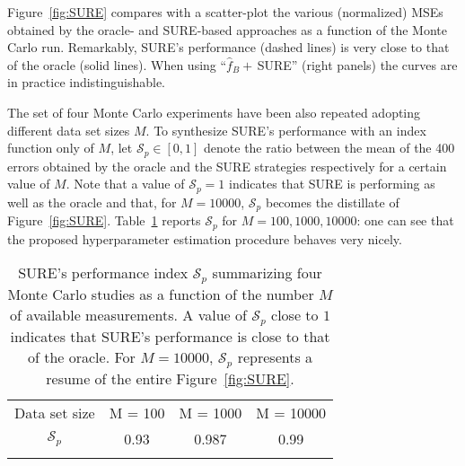 \documentclass[10pt,twocolumn,twoside]{IEEEtran}					%
\theoremstyle	{plain}
\newcommand	{\Figure}				[0]	{Figure}
\newcommand	{\Table}				[0]	{Table}
\begin{document}
\Figure~\ref{fig:SURE} compares with a scatter-plot the various (normalized) \acp{MSE} obtained by the oracle- and \ac{SURE}-based approaches as a function of the Monte Carlo run. Remarkably, \ac{SURE}'s performance (dashed lines) is very close to that of the oracle (solid lines). When using ``$\widehat{f}_{B}+\,$SURE'' (right panels) the curves are in practice indistinguishable.

\begin{figure*}
	\centering
	
	\caption{Comparison of the MSE indexes obtained by the \ac{SURE}- and oracle-based strategies. Each circle corresponds to the result of a certain Monte Carlo run (the $x$-axis being associated to oracle-based estimators, and the $y$-axis to SURE-based ones). The fact that the circles groups are close to the bisector of the first quadrant indicates that the performance of \ac{SURE} is almost equivalent to that of the oracle.}
\label{fig:SURE}
\end{figure*}


The set of four Monte Carlo experiments have been also repeated adopting different data set sizes $M$. To synthesize \ac{SURE}'s performance with an index function only of $M$, let $\mathcal{S}_p \in [0,1]$ denote the ratio between the mean of the 400 errors obtained by the oracle and the \ac{SURE} strategies respectively for a certain value of $M$. Note that a value of $\mathcal{S}_p=1$ indicates that \ac{SURE} is performing as well as the oracle and that, for $M=10000$, $\mathcal{S}_p$ becomes the distillate of \Figure~\ref{fig:SURE}. \Table~\ref{Table1} reports $\mathcal{S}_p$ for $M=100,1000,10000$: one can see that the proposed hyperparameter estimation procedure behaves very nicely.

\begin{table}
\begin{center}
\begin{tabular}{cccc}\hline
Data set size & M = 100 & M = 1000 & M = 10000 \\
$\mathcal{S}_p$ & 0.93 & 0.987 & 0.99 \\
\hline \phantom{|}
\end{tabular} 
\end{center}
\caption{\ac{SURE}'s performance index $\mathcal{S}_p$ summarizing four Monte Carlo studies as a function of the number $M$ of available measurements. A value of $\mathcal{S}_p$ close to $1$ indicates that \ac{SURE}'s performance is close to that of the oracle. For $M=10000$, $\mathcal{S}_p$ represents a resume of the entire
\Figure~\ref{fig:SURE}.}
	\label{Table1}
\end{table}
\end{document}
